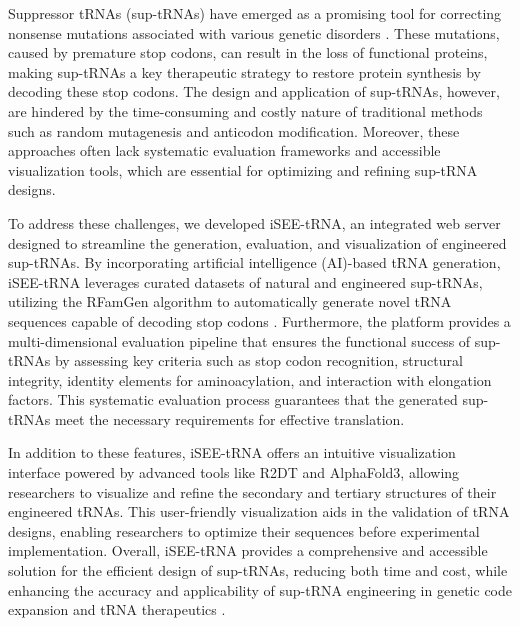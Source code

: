 Suppressor tRNAs (sup-tRNAs) have emerged as a promising tool for correcting nonsense mutations associated with various genetic disorders \cite{albers_engineered_2023}. These mutations, caused by premature stop codons, can result in the loss of functional proteins, making sup-tRNAs a key therapeutic strategy to restore protein synthesis by decoding these stop codons. The design and application of sup-tRNAs, however, are hindered by the time-consuming and costly nature of traditional methods such as random mutagenesis and anticodon modification. Moreover, these approaches often lack systematic evaluation frameworks and accessible visualization tools, which are essential for optimizing and refining sup-tRNA designs.

To address these challenges, we developed iSEE-tRNA, an integrated web server designed to streamline the generation, evaluation, and visualization of engineered sup-tRNAs. By incorporating artificial intelligence (AI)-based tRNA generation, iSEE-tRNA leverages curated datasets of natural and engineered sup-tRNAs, utilizing the RFamGen algorithm to automatically generate novel tRNA sequences capable of decoding stop codons \cite{sumi_deep_2024}. Furthermore, the platform provides a multi-dimensional evaluation pipeline that ensures the functional success of sup-tRNAs by assessing key criteria such as stop codon recognition, structural integrity, identity elements for aminoacylation, and interaction with elongation factors. This systematic evaluation process guarantees that the generated sup-tRNAs meet the necessary requirements for effective translation.

In addition to these features, iSEE-tRNA offers an intuitive visualization interface powered by advanced tools like R2DT and AlphaFold3, allowing researchers to visualize and refine the secondary and tertiary structures of their engineered tRNAs. This user-friendly visualization aids in the validation of tRNA designs, enabling researchers to optimize their sequences before experimental implementation. Overall, iSEE-tRNA provides a comprehensive and accessible solution for the efficient design of sup-tRNAs, reducing both time and cost, while enhancing the accuracy and applicability of sup-tRNA engineering in genetic code expansion and tRNA therapeutics \cite{tang_recent_2022, shandell_genetic_2021}.


